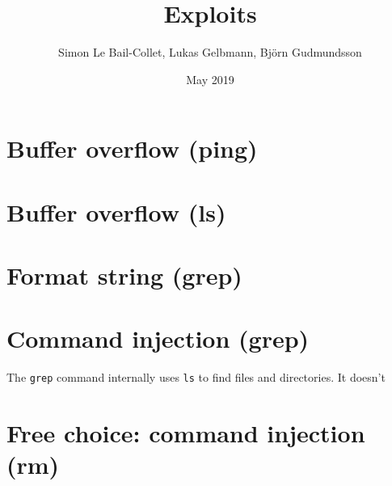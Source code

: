 \documentclass{article}
\title{Exploits}
\author{Simon Le Bail-Collet, Lukas Gelbmann, Björn Gudmundsson}
\date{May 2019}
\begin{document}
\maketitle

\section{Buffer overflow (ping)}

\section{Buffer overflow (ls)}

\section{Format string (grep)}

\section{Command injection (grep)}

The \texttt{grep} command internally uses \texttt{ls} to find files and directories.
It doesn't

\section{Free choice: command injection (rm)}
\end{document}
